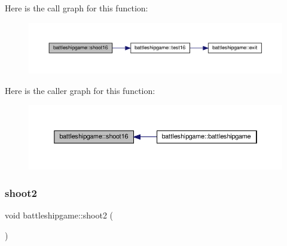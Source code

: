 Here is the call graph for this function\+:
\nopagebreak
\begin{figure}[H]
\begin{center}
\leavevmode
\includegraphics[width=350pt]{classbattleshipgame_a1dddc9c9d3ced3792fc33ec510976e8f_cgraph}
\end{center}
\end{figure}
Here is the caller graph for this function\+:
\nopagebreak
\begin{figure}[H]
\begin{center}
\leavevmode
\includegraphics[width=350pt]{classbattleshipgame_a1dddc9c9d3ced3792fc33ec510976e8f_icgraph}
\end{center}
\end{figure}
\mbox{\label{classbattleshipgame_ab43d1b9348297ee4260ee31963efd49c}} 
\subsubsection{\texorpdfstring{shoot2}{shoot2}}
{\footnotesize\ttfamily void battleshipgame\+::shoot2 (\begin{DoxyParamCaption}{ }\end{DoxyParamCaption})\hspace{0.3cm}{\ttfamily [slot]}}

